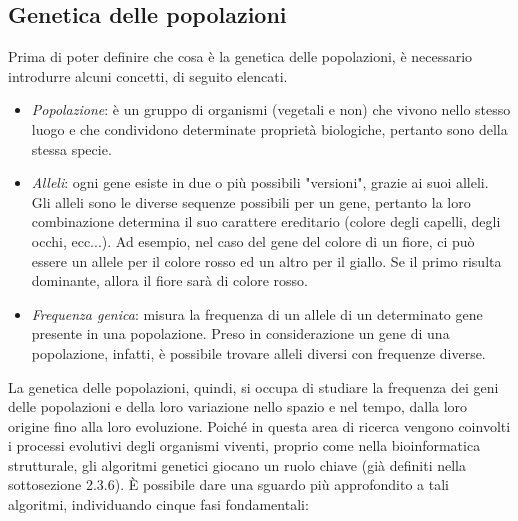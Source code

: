 \subsection{Genetica delle popolazioni}
Prima di poter definire che cosa è la genetica delle popolazioni, è necessario introdurre alcuni concetti, di seguito elencati.
\begin{itemize}
	\item \textit{Popolazione}: è un gruppo di organismi (vegetali e non) che vivono nello stesso luogo e che condividono determinate proprietà biologiche, pertanto sono della stessa specie.
	\item \textit{Alleli}: ogni gene esiste in due o più possibili "versioni", grazie ai suoi alleli. Gli alleli sono le diverse sequenze possibili per un gene, pertanto la loro combinazione determina il suo carattere ereditario (colore degli capelli, degli occhi, ecc...). Ad esempio, nel caso del gene del colore di un fiore, ci può essere un allele per il colore rosso ed un altro per il giallo. Se il primo risulta dominante, allora il fiore sarà di colore rosso.
	\item \textit{Frequenza genica}: misura la frequenza di un allele di un determinato gene presente in una popolazione.
	\newline
	Preso in considerazione un gene di una popolazione, infatti, è possibile trovare alleli diversi con frequenze diverse.
\end{itemize}
La genetica delle popolazioni, quindi, si occupa di studiare la frequenza dei geni delle popolazioni e della loro variazione nello spazio e nel tempo, dalla loro origine fino alla loro evoluzione.
\newline
Poiché in questa area di ricerca vengono coinvolti i processi evolutivi degli organismi viventi, proprio come nella bioinformatica strutturale, gli algoritmi genetici giocano un ruolo chiave (già definiti nella sottosezione 2.3.6). 
\newline
\`E possibile dare una sguardo più approfondito a tali algoritmi, individuando cinque fasi fondamentali:
